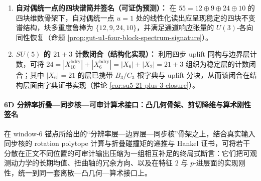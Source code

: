 \begin{theorem}
\begin{enumerate}
  \item \textbf{自对偶统一点的四块谱简并签名（可证伪预测）：}
  在 \(55=12\oplus 9\oplus 24\oplus 10\) 的四块维数骨架下，自对偶统一点 \(u=1\) 处的线性化读出应呈现稳定的四块不变谱结构，块多重度鲁棒为 \(\{12,9,24,10\}\)，并满足通道响应张量的 \(U(3)\)-各向同性恢复（命题 \ref{prop:gut-u1-four-block-spectrum-signature}）。

  \item \textbf{\texorpdfstring{$SU(5)$}{SU(5)} 的 \(21+3\) 计数闭合（结构化实现）：}
  利用四步 uplift 同构与边界层计数，可将
  \(
  24=|X_{10}^{\mathrm{bdry}}|+|X_6^{\mathrm{bdry}}|
  =|X_6|+|X_2|=21+3
  \)
  组织为稳定层的计数闭合；其中 \(|X_6|=21\) 的层已携带 \(B_3/C_3\) 根字典与 uplift 分块，从而该闭合在结构层面由字典证书实现（推论 \ref{cor:su5-21-plus-3-closure}）。
\end{enumerate}
\end{theorem}

\paragraph{6D 分辨率折叠—同步核—可审计算术接口：凸几何骨架、剪切降维与算术刚性签名}
在 window-\(6\) 锚点所给出的“分辨率层—边界层—同步核”骨架之上，结合真实输入同步核的 rotation polytope 计算与折叠碰撞矩的递推与 Hankel 证书，可将若干分散在正文不同位置的可审计输出压缩为一组相互补足的终局式断言：它们把可观测动力学的长期均值、扭曲轴的冗余方向、以及在特征 \(2\) 与 \(p\)-进层面的实现刚性，统一到同一套离散—凸几何—算术接口上。

